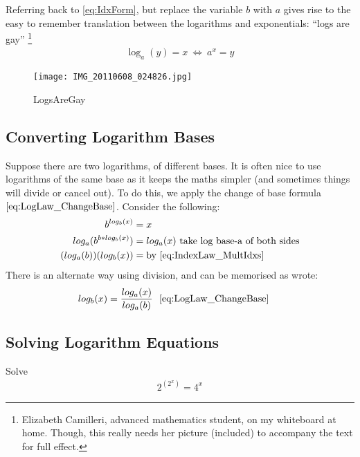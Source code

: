 Referring back to \ref{eq:IdxForm}, but replace the variable $b$ with $a$ gives
rise to the easy to remember translation between the logarithms
and exponentials: ``logs are gay'' \footnote{Elizabeth Camilleri, advanced
mathematics student, on my whiteboard at home. Though, this really needs her
picture (included) to accompany the text for full effect.}
\begin{align}
  \log_a(y) = x ~ \Longleftrightarrow ~ {a}^{x} = y  \label{eq:LogsAreGay}
\end{align}
\begin{figure}[!htb]
  \centering
  \texttt{[image: IMG\_20110608\_024826.jpg]}
  \caption{LogsAreGay}
  \label{fig:LogsAreGay}
\end{figure}

\subsection{Converting Logarithm Bases}
Suppose there are two logarithms, of different bases. It is often nice to use
logarithms of the same base as it keeps the maths simpler (and sometimes things
will divide or cancel out). To do this, we apply the change of base formula
$\eqref{eq:LogLaw_ChangeBase}$. Consider the following:
\begin{align}
  b^{log_b(x)} & = x \\
  log_a(b^{b * log_b(x)}) & = log_a(x) ~ \text{take log base-a of both sides} \\
  (log_a(b))(log_b(x)) & = \text{by \eqref{eq:IndexLaw_MultIdxs}}
\end{align}
There is an alternate way using division, and can be memorised as wrote:
\begin{align}
  log_b(x) & = \frac{log_a(x)}{log_a(b)} ~ \text{ \eqref{eq:LogLaw_ChangeBase} }
  \nonumber
\end{align} 

\subsection{Solving Logarithm Equations}
Solve
\begin{align}
  2^{(2^x)} = 4^x
\end{align}

